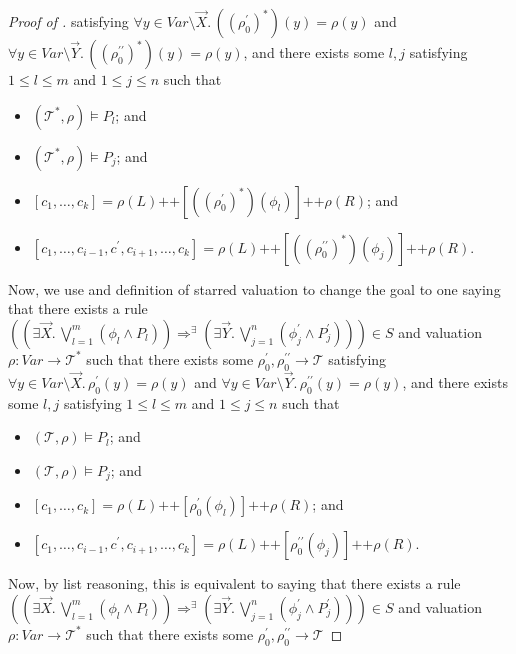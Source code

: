 \documentclass{article}
\begin{document}
\begin{proof}[Proof of ]
satisfying $\forall y \in \mathit{Var} \setminus \vec{X}.\, ((\rho_0^\prime)^*)(y) = \rho(y)$
and $\forall y \in \mathit{Var} \setminus \vec{Y}.\, ((\rho_0^{\prime\prime})^*)(y) = \rho(y)$,
and there exists some $l,j$ satisfying $1 \leq l \leq m$ and $1 \leq j \leq n$ such that
\begin{itemize}
    \item $(\mathcal{T}^*, \rho) \vDash P_l$; and
    \item $(\mathcal{T}^*, \rho) \vDash P_j$; and
    \item $[c_1,\ldots,c_k] = \rho(L) \texttt{++} [((\rho_0^\prime)^*)(\phi_l)] \texttt{++} \rho(R)$; and
    \item $[c_1, \ldots, c_{i-1}, c^\prime, c_{i+1}, \ldots, c_k] = \rho(L)
    \texttt{++} [((\rho_0^{\prime\prime})^*)(\phi_j)] 
    \texttt{++} \rho(R)$.
\end{itemize}
Now, we use  and definition of starred valuation to change the goal to one saying that
there exists a rule $((\exists \vec{X}.\, \bigvee_{l=1}^{m} (\phi_l \land P_l)) \Rightarrow^\exists (\exists \vec{Y}.\, \bigvee_{j=1}^{n} (\phi^\prime_j \land P^\prime_j))) \in S$
and valuation $\rho : \mathit{Var} \to \mathcal{T}^*$ such that
there exists some $\rho_0^\prime,\rho_0^{\prime\prime} \to \mathcal{T}$
satisfying $\forall y \in \mathit{Var} \setminus \vec{X}.\, \rho_0^\prime(y) = \rho(y)$
and $\forall y \in \mathit{Var} \setminus \vec{Y}.\, \rho_0^{\prime\prime}(y) = \rho(y)$,
and there exists some $l,j$ satisfying $1 \leq l \leq m$ and $1 \leq j \leq n$ such that
\begin{itemize}
    \item $(\mathcal{T}, \rho) \vDash P_l$; and
    \item $(\mathcal{T}, \rho) \vDash P_j$; and
    \item $[c_1,\ldots,c_k] = \rho(L) \texttt{++} [\rho_0^\prime(\phi_l)] \texttt{++} \rho(R)$; and
    \item $[c_1, \ldots, c_{i-1}, c^\prime, c_{i+1}, \ldots, c_k] = \rho(L)
    \texttt{++} [\rho_0^{\prime\prime}(\phi_j)] 
    \texttt{++} \rho(R)$.
\end{itemize}
Now, by list reasoning, this is equivalent to
saying that
there exists a rule $((\exists \vec{X}.\, \bigvee_{l=1}^{m} (\phi_l \land P_l)) \Rightarrow^\exists (\exists \vec{Y}.\, \bigvee_{j=1}^{n} (\phi^\prime_j \land P^\prime_j))) \in S$
and valuation $\rho : \mathit{Var} \to \mathcal{T}^*$ such that
there exists some $\rho_0^\prime,\rho_0^{\prime\prime} \to \mathcal{T}$

\end{proof}
\end{document}
